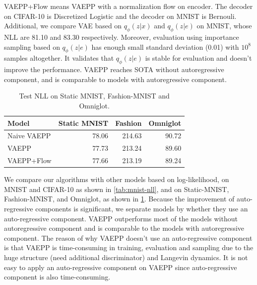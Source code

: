 \begin{table}[tb]
{%
VAEPP+Flow means VAEPP with a normalization flow on encoder. The decoder on CIFAR-10 is Discretized Logistic and the decoder on MNIST is Bernouli. 
Additional, we compare VAE based on $q_\phi(z|x)$ and $q_\phi(z|e)$ on MNIST, whose NLL are 81.10 and 83.30 respectively. Moreover, evaluation using importance sampling based on $q_\phi(z|e)$ has enough small standard deviation (0.01) with $10^8$ samples altogether. It validates that $q_\phi(z|e)$ is stable for evaluation and doesn't improve the performance. VAEPP reaches SOTA without autoregressive component, and is comparable to models with autoregressive component. }
\label{tab:mnist-nll}
\end{table}
\begin{table}[tb]
\centering
\begin{tabular}{lrrr}  
\toprule
Model   & Static MNIST & Fashion & Omniglot \\
\midrule
Naive VAEPP    &   78.06   &  214.63  &   90.72 \\
VAEPP          &   77.73   &  213.24  &   89.60  \\
VAEPP+Flow     &   77.66   &  213.19  &   89.24  \\
\bottomrule
\end{tabular}
\caption{Test NLL on Static MNIST, Fashion-MNIST and Omniglot.  }
\label{tab:cifar-nll}
\end{table}
We compare our algorithms with other models based on log-likelihood, on MNIST and CIFAR-10 as shown in \cref{tab:mnist-nll}, and on Static-MNIST, Fashion-MNIST, and Omniglot, as shown in \cref{tab:cifar-nll}. Because the improvement of auto-regressive components is significant, we separate models by whether they use an auto-regressive component. VAEPP outperforms most of the models without autoregressive component and is comparable to the models with autoregressive component. The reason of why VAEPP doesn't use an auto-regressive component is that VAEPP is time-consuming in training,  evaluation and sampling due to the huge structure (need additional discriminator) and Langevin dynamics. It is not easy to apply an auto-regressive component on VAEPP since auto-regressive component is also time-consuming. 
